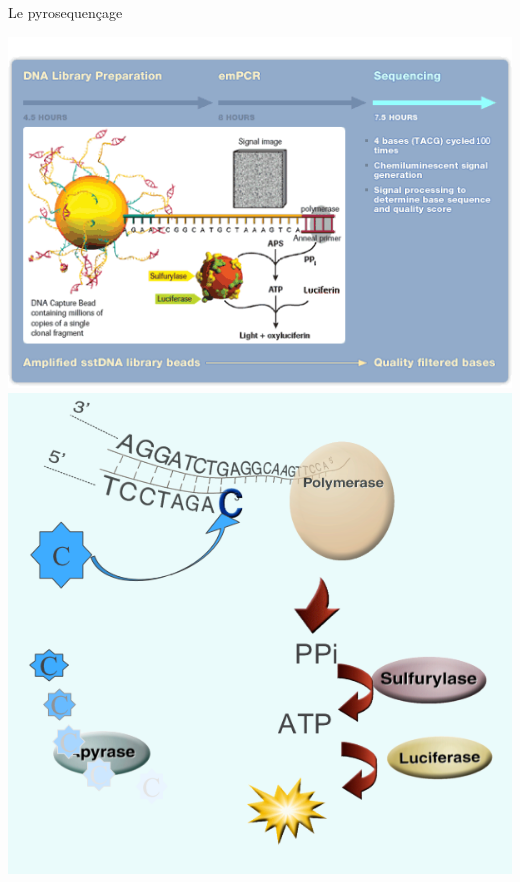 \documentclass[12pt]{beamer}
\begin{document}
\begin{frame}{Le pyrosequençage}
\begin{center}
\includegraphics[scale=0.48]{./img/sequ454.png}
\includegraphics[scale=0.3]{./img/proces.png}
\end{center}
\end{frame}
\end{document}
